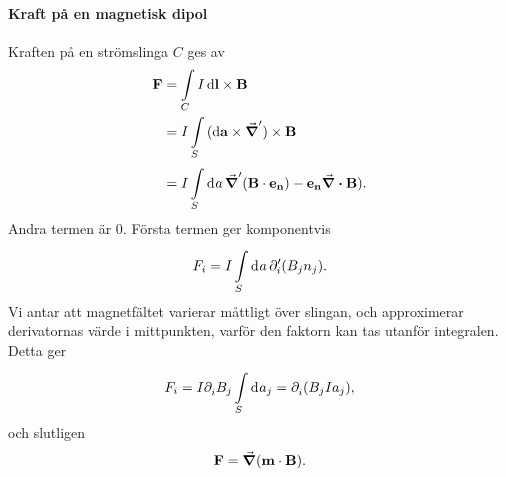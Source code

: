 \paragraph{Kraft på en magnetisk dipol}
Kraften på en strömslinga $C$ ges av
\begin{align*}
	\vb{F} &= \int\limits_{C}{I\dd{\vb{l}}\times\vb{B}} \\
	       &= I\int\limits_{S}{(\dd{\vb{a}}\times\grad')\times\vb{B}} \\
	       &= I\int\limits_{S}^{}\dd[]{a}\grad'(\vb{B}\cdot\vb{e}_{\vb{n}}) - \vb{e}_{\vb{n}}\div{\vb{B}}).
\end{align*}
Andra termen är $0$. Första termen ger komponentvis
\begin{align*}
	F_{i} = I\int\limits_{S}^{}\dd[]{a}\partial_{i}^{\prime}(B_{j}n_{j}).
\end{align*}
Vi antar att magnetfältet varierar måttligt över slingan, och approximerar derivatornas värde i mittpunkten, varför den faktorn kan tas utanför integralen. Detta ger
\begin{align*}
	F_{i} = I\partial_{i}^{}B_{j}\int\limits_{S}^{}\dd[]{a_{j}} = \partial_{i}^{}(B_{j}Ia_{j}),
\end{align*}
och slutligen
\begin{align*}
	\vb{F} = \grad(\vb{m}\cdot\vb{B}).
\end{align*}

